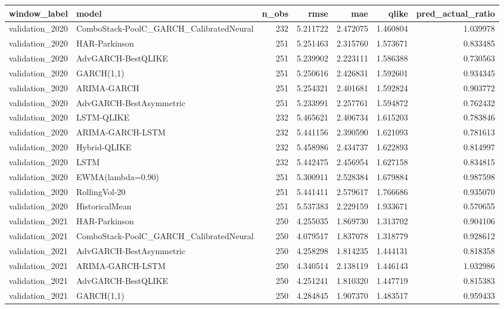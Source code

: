 \begin{tabular}{l l r r r r r}
\hline
window\_label & model & n\_obs & rmse & mae & qlike & pred\_actual\_ratio \\
\hline
validation\_2020 & ComboStack-PoolC\_GARCH\_CalibratedNeural & 232 & 5.211722 & 2.472075 & 1.460804 & 1.039978 \\
validation\_2020 & HAR-Parkinson & 251 & 5.251463 & 2.315760 & 1.573671 & 0.833485 \\
validation\_2020 & AdvGARCH-BestQLIKE & 251 & 5.239902 & 2.223111 & 1.586388 & 0.730563 \\
validation\_2020 & GARCH(1,1) & 251 & 5.250616 & 2.426831 & 1.592601 & 0.934345 \\
validation\_2020 & ARIMA-GARCH & 251 & 5.254321 & 2.401681 & 1.592824 & 0.903772 \\
validation\_2020 & AdvGARCH-BestAsymmetric & 251 & 5.233991 & 2.257761 & 1.594872 & 0.762432 \\
validation\_2020 & LSTM-QLIKE & 232 & 5.465621 & 2.406734 & 1.615203 & 0.783846 \\
validation\_2020 & ARIMA-GARCH-LSTM & 232 & 5.441156 & 2.390590 & 1.621093 & 0.781613 \\
validation\_2020 & Hybrid-QLIKE & 232 & 5.458986 & 2.434737 & 1.622893 & 0.814997 \\
validation\_2020 & LSTM & 232 & 5.442475 & 2.456954 & 1.627158 & 0.834815 \\
validation\_2020 & EWMA(lambda=0.90) & 251 & 5.300911 & 2.528384 & 1.679884 & 0.987598 \\
validation\_2020 & RollingVol-20 & 251 & 5.441411 & 2.579617 & 1.766686 & 0.935070 \\
validation\_2020 & HistoricalMean & 251 & 5.537383 & 2.229159 & 1.933671 & 0.570655 \\
validation\_2021 & HAR-Parkinson & 250 & 4.255035 & 1.869730 & 1.313702 & 0.904106 \\
validation\_2021 & ComboStack-PoolC\_GARCH\_CalibratedNeural & 250 & 4.079517 & 1.837078 & 1.318779 & 0.928612 \\
validation\_2021 & AdvGARCH-BestAsymmetric & 250 & 4.258298 & 1.814235 & 1.444131 & 0.818358 \\
validation\_2021 & ARIMA-GARCH-LSTM & 250 & 4.340514 & 2.138119 & 1.446143 & 1.032986 \\
validation\_2021 & AdvGARCH-BestQLIKE & 250 & 4.251241 & 1.810320 & 1.447719 & 0.815383 \\
validation\_2021 & GARCH(1,1) & 250 & 4.284845 & 1.907370 & 1.483517 & 0.959433 \\

\end{tabular}
